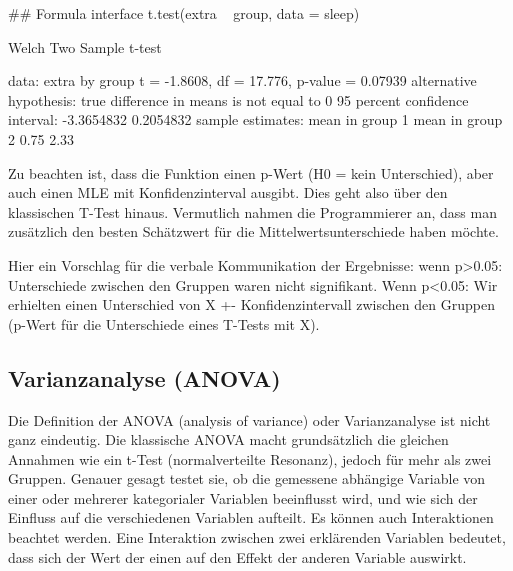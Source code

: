 \documentclass[a4paper,twoside]{tufte-book}\usepackage[]{graphicx}\usepackage[]{color}
\begin{document}
\begin{Schunk}
\begin{Sinput}
## Formula interface
t.test(extra ~ group, data = sleep)
\end{Sinput}
\begin{Soutput}

	Welch Two Sample t-test

data:  extra by group
t = -1.8608, df = 17.776, p-value = 0.07939
alternative hypothesis: true difference in means is not equal to 0
95 percent confidence interval:
 -3.3654832  0.2054832
sample estimates:
mean in group 1 mean in group 2 
           0.75            2.33 
\end{Soutput}
\end{Schunk}

Zu beachten ist, dass die Funktion einen p-Wert (H0 = kein Unterschied), aber auch einen MLE mit Konfidenzinterval ausgibt. Dies geht also über den klassischen T-Test hinaus. Vermutlich nahmen die Programmierer an, dass man zusätzlich den besten Schätzwert für die Mittelwertsunterschiede haben möchte.

Hier ein Vorschlag für die verbale Kommunikation der Ergebnisse: wenn p>0.05: Unterschiede zwischen den Gruppen waren nicht signifikant. Wenn p<0.05: Wir erhielten einen Unterschied von X +- Konfidenzintervall zwischen den Gruppen (p-Wert für die Unterschiede eines T-Tests mit X). 


\subsection{Varianzanalyse (ANOVA)}

Die Definition der ANOVA (analysis of variance) oder Varianzanalyse ist nicht ganz eindeutig. Die klassische ANOVA macht grundsätzlich die gleichen Annahmen wie ein t-Test (normalverteilte Resonanz), jedoch für mehr als zwei Gruppen. Genauer gesagt testet sie, ob die gemessene abhängige Variable von einer oder mehrerer kategorialer Variablen beeinflusst wird, und wie sich der Einfluss auf die verschiedenen Variablen aufteilt. Es können auch Interaktionen beachtet werden. Eine Interaktion zwischen zwei erklärenden Variablen bedeutet, dass sich der Wert der einen auf den Effekt der anderen Variable auswirkt. 
\end{document}
